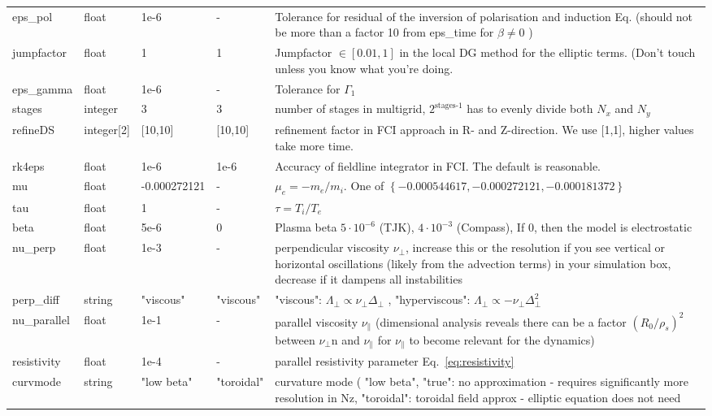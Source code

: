 \begin{longtable}{llll>{\RaggedRight}p{6cm}}
\\
eps\_pol    & float & 1e-6  & - &  Tolerance for residual of the inversion of polarisation and induction Eq. (should not be more than a factor 10 from eps\_time for $\beta\neq  0$ )
\\
jumpfactor  & float & 1 & 1 & Jumpfactor $\in \left[0.01,1\right]$ in the local DG method for the elliptic terms. (Don't touch unless you know what you're doing.
\\
eps\_gamma  & float & 1e-6  & - & Tolerance for $\Gamma_1$
\\
stages      & integer & 3 & 3 & number of stages in multigrid, $2^{\text{stages-1}}$
has to evenly divide both $N_x$ and $N_y$
\\
refineDS     & integer[2] & [10,10] & [10,10] & refinement factor in FCI approach in R- and Z-direction.
We use [1,1], higher values take more time.
\\
rk4eps     & float & 1e-6 & 1e-6 & Accuracy of fieldline integrator in FCI. The default is reasonable.
\\
mu         & float & -0.000272121& - & $\mu_e =-m_e/m_i$.
    One of $\left\{ -0.000544617, -0.000272121, -0.000181372 \right\}$
\\
tau        & float &1      & - & $\tau = T_i/T_e$
\\
beta       & float & 5e-6  & 0 & Plasma beta $5\cdot 10^{-6}$ (TJK), $4\cdot
10^{-3}$ (Compass), If $0$, then the model is electrostatic
\\
nu\_perp   & float &1e-3   & - & perpendicular viscosity $\nu_\perp$, increase
this or the resolution if you see vertical or horizontal oscillations (likely
from the advection terms) in your simulation box, decrease if it dampens all
instabilities
\\
perp\_diff & string & "viscous" & "viscous" & "viscous": $\Lambda_\perp\propto
\nu_\perp\Delta_\perp$ , "hyperviscous": $\Lambda_\perp \propto
-\nu_\perp\Delta_\perp^2$
\\
nu\_parallel & float &1e-1 & - & parallel viscosity $\nu_\parallel$
(dimensional analysis reveals there can be a factor $(R_0/\rho_s)^2$ between
$\nu_\perp $n and $\nu_\parallel$ for $\nu_\parallel$ to become relevant for
the dynamics)
\\
resistivity & float &1e-4  & - & parallel resistivity parameter Eq.~\eqref{eq:resistivity}
\\
curvmode  & string & "low beta"  & "toroidal" &
curvature mode (
"low beta",
"true": no approximation - requires significantly more resolution in Nz,
"toroidal": toroidal field approx - elliptic equation does not need

\end{longtable}
